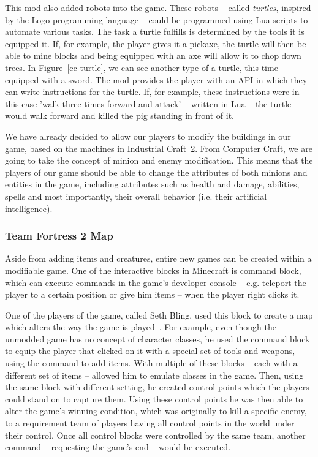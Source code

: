 This mod also added robots into the game. These robots -- called \emph{turtles}, inspired by the Logo programming language -- 
could be programmed using Lua scripts to automate 
various tasks. The task a turtle fulfills is determined by the tools it is equipped it. If, for example, the player gives it a pickaxe, 
the turtle will then be able to mine blocks and being equipped with an axe will allow it to chop down trees. 
In Figure~\ref{cc-turtle}, we
can see another type of a turtle, this time equipped with a sword. The mod provides the player with an API in which they can write
instructions for the turtle. If, for example, these instructions were in this case 'walk three times forward and attack' 
-- written in Lua -- the turtle would walk forward and killed the pig standing in front of it.

We have already decided to allow our players to modify the buildings in our game, based on the machines in Industrial Craft~2. 
From Computer Craft, we are going to take the concept of minion and enemy modification. This means that the players
of our game should be able to change the attributes of both minions and entities in the game, including attributes such as health and
damage, abilities, spells and most importantly, their overall behavior (i.e. their artificial intelligence).

\subsubsection{Team Fortress 2 Map}

Aside from adding items and creatures, entire new games can be created within a modifiable game.
One of the interactive blocks in Minecraft is command block,
which can execute commands in the game's developer console -- e.g. teleport the player to a certain position or give him items --
when the player right clicks it.

One of the players of the game, called Seth Bling, used this block to create a map which alters the way the game is 
played~\cite{FutureOfMinecraft}. For example, even though the 
unmodded game has no concept of character classes, he used the command block to equip the player that clicked on it with a special
set of tools and weapons, using the command to add items. With multiple of these blocks -- each with a different set of items -- 
allowed him to emulate classes in the game. Then, using the same block with different setting, he created control points which
the players could stand on to capture them. Using these control points he was then able to alter the game's winning condition, which
was originally to kill a specific enemy, to a requirement team of players having all control points in the world under their control.
Once all control blocks were controlled by the same team, another command -- requesting the game's end -- would be executed.

